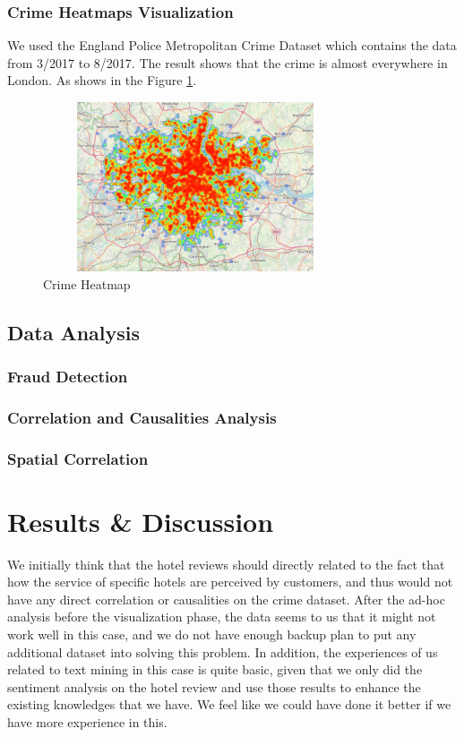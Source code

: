 \documentclass[conference]{IEEEtran}
\begin{document}
\subsubsection{Crime Heatmaps Visualization}
We used the England Police Metropolitan Crime Dataset which contains the data from 3/2017 to 8/2017. The result shows that the crime is almost everywhere in London. As shows in the  Figure \ref{fig:crimemap}.

\begin{figure}[h]
  \centering
  \includegraphics[width=9cm,height=5cm]{Heatmap.jpg}
  \caption{Crime Heatmap}
  \label{fig:crimemap}
\end{figure}

\subsection{Data Analysis}
\subsubsection{Fraud Detection}
\subsubsection{Correlation and Causalities Analysis}
\subsubsection{Spatial Correlation}
\section{Results \& Discussion}
We initially think that the hotel reviews should directly related to the fact that how the service of specific hotels are perceived by customers, and thus would not have any direct correlation or causalities on the crime dataset. After the ad-hoc analysis before the visualization phase, the data seems to us that it might not work well in this case, and we do not have enough backup plan to put any additional dataset into solving this problem. In addition, the experiences of us related to text mining in this case is quite basic, given that we only did the sentiment analysis on the hotel review and use those results to enhance the existing knowledges that we have. We feel like we could have done it better if we have more experience in this.
\end{document}
